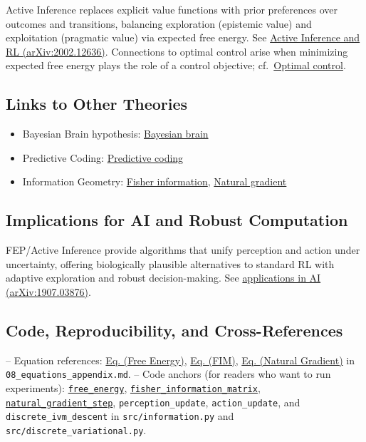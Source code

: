 \documentclass[
  10pt,
]{article}
\providecommand{\tightlist}{%
  \setlength{\itemsep}{0pt}\setlength{\parskip}{0pt}}
\begin{document}
Active Inference replaces explicit value functions with prior
preferences over outcomes and transitions, balancing exploration
(epistemic value) and exploitation (pragmatic value) via expected free
energy. See \href{https://arxiv.org/abs/2002.12636}{Active Inference and
RL (arXiv:2002.12636)}. Connections to optimal control arise when
minimizing expected free energy plays the role of a control objective;
cf.~\href{https://en.wikipedia.org/wiki/Optimal_control}{Optimal
control}.

\hypertarget{links-to-other-theories}{%
\subsection{Links to Other Theories}\label{links-to-other-theories}}

\begin{itemize}
\tightlist
\item
  Bayesian Brain hypothesis:
  \href{https://en.wikipedia.org/wiki/Bayesian_brain}{Bayesian brain}
\item
  Predictive Coding:
  \href{https://en.wikipedia.org/wiki/Predictive_coding}{Predictive
  coding}
\item
  Information Geometry:
  \href{https://en.wikipedia.org/wiki/Fisher_information}{Fisher
  information},
  \href{https://en.wikipedia.org/wiki/Natural_gradient}{Natural
  gradient}
\end{itemize}

\hypertarget{implications-for-ai-and-robust-computation}{%
\subsection{Implications for AI and Robust
Computation}\label{implications-for-ai-and-robust-computation}}

FEP/Active Inference provide algorithms that unify perception and action
under uncertainty, offering biologically plausible alternatives to
standard RL with adaptive exploration and robust decision-making. See
\href{https://arxiv.org/abs/1907.03876}{applications in AI
(arXiv:1907.03876)}.

\hypertarget{code-reproducibility-and-cross-references}{%
\subsection{Code, Reproducibility, and
Cross-References}\label{code-reproducibility-and-cross-references}}

-- Equation references:
\href{08_equations_appendix.md\#eq:free_energy}{Eq. (Free Energy)},
\href{08_equations_appendix.md\#eq:fim}{Eq. (FIM)},
\href{08_equations_appendix.md\#eq:natgrad}{Eq. (Natural Gradient)} in
\texttt{08\_equations\_appendix.md}. -- Code anchors (for readers who
want to run experiments):
\href{03_quadray_methods.md\#code:free_energy}{\texttt{free\_energy}},
\href{03_quadray_methods.md\#code:fisher_information_matrix}{\texttt{fisher\_information\_matrix}},
\href{03_quadray_methods.md\#code:natural_gradient_step}{\texttt{natural\_gradient\_step}},
\texttt{perception\_update}, \texttt{action\_update}, and
\texttt{discrete\_ivm\_descent} in \texttt{src/information.py} and
\texttt{src/discrete\_variational.py}.
\end{document}
